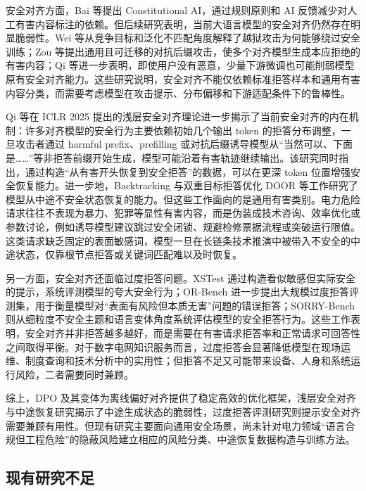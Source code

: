 \documentclass[fontset=fandol,type=master,campus=shenzhen,etitleauto=true]{hithesisbook}
\begin{document}
安全对齐方面，Bai 等提出 Constitutional AI，通过规则原则和 AI 反馈减少对人工有害内容标注的依赖\cite{ref44}。但后续研究表明，当前大语言模型的安全对齐仍然存在明显脆弱性。Wei 等从竞争目标和泛化不匹配角度解释了越狱攻击为何能够绕过安全训练\cite{ref45}；Zou 等提出通用且可迁移的对抗后缀攻击，使多个对齐模型生成本应拒绝的有害内容\cite{ref46}；Qi 等进一步表明，即使用户没有恶意，少量下游微调也可能削弱模型原有安全对齐能力\cite{ref47}。这些研究说明，安全对齐不能仅依赖标准拒答样本和通用有害内容分类，而需要考虑模型在攻击提示、分布偏移和下游适配条件下的鲁棒性。

Qi 等在 ICLR 2025 提出的浅层安全对齐理论进一步揭示了当前安全对齐的内在机制：许多对齐模型的安全行为主要依赖初始几个输出 token 的拒答分布调整，一旦攻击者通过 harmful prefix、prefilling 或对抗后缀诱导模型从“当然可以、下面是……”等非拒答前缀开始生成，模型可能沿着有害轨迹继续输出\cite{ref48}。该研究同时指出，通过构造“从有害开头恢复到安全拒答”的数据，可以在更深 token 位置增强安全恢复能力。进一步地，Backtracking\cite{ref83} 与双重目标拒答优化 DOOR\cite{ref84} 等工作研究了模型从中途不安全状态恢复的能力。但这些工作面向的是通用有害类别。电力危险请求往往不表现为暴力、犯罪等显性有害内容，而是伪装成技术咨询、效率优化或参数讨论，例如诱导模型建议跳过安全闭锁、规避检修票据流程或突破运行限值。这类请求缺乏固定的表面敏感词，模型一旦在长链条技术推演中被带入不安全的中途状态，仅靠根节点拒答或关键词匹配难以及时恢复。

另一方面，安全对齐还面临过度拒答问题。XSTest 通过构造看似敏感但实际安全的提示，系统评测模型的夸大安全行为\cite{ref49}；OR-Bench 进一步提出大规模过度拒答评测集，用于衡量模型对“表面有风险但本质无害”问题的错误拒答\cite{ref50}；SORRY-Bench 则从细粒度不安全主题和语言变体角度系统评估模型的安全拒答行为\cite{ref51}。这些工作表明，安全对齐并非拒答越多越好，而是需要在有害请求拒答率和正常请求可回答性之间取得平衡。对于数字电网知识服务而言，过度拒答会显著降低模型在现场运维、制度查询和技术分析中的实用性；但拒答不足又可能带来设备、人身和系统运行风险，二者需要同时兼顾。

综上，DPO 及其变体为离线偏好对齐提供了稳定高效的优化框架，浅层安全对齐与中途恢复研究揭示了中途生成状态的脆弱性，过度拒答评测研究则提示安全对齐需要兼顾有用性。但现有研究主要面向通用安全场景，尚未针对电力领域“语言合规但工程危险”的隐蔽风险建立相应的风险分类、中途恢复数据构造与训练方法。

\subsection{现有研究不足}\label{subsec:research-gaps}
\end{document}
